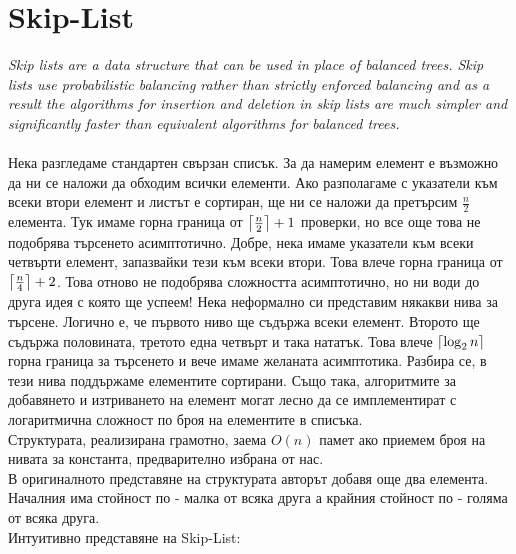 \documentclass[a4paper,12pt,fleqn]{article}
\DeclarePairedDelimiter\ceil{\lceil}{\rceil}
\begin{document}
	\section{Skip-List}
	\textit{Skip lists are a data structure that can be used in place of balanced trees.
		Skip lists use probabilistic balancing rather than strictly enforced balancing
		and as a result the algorithms for insertion and deletion in skip lists are
		much simpler and significantly faster than equivalent algorithms for
		balanced trees.}\\
	\\Нека разгледаме стандартен свързан списък. За да намерим елемент е възможно да ни се наложи да обходим всички елементи. Ако разполагаме с указатели към всеки втори елемент и листът е сортиран, ще ни се наложи да претърсим $\frac{n}{2}$ елемента. Тук имаме горна граница от $\ceil*{\frac{n}{2}} + 1$ проверки, но все още това не подобрява търсенето асимптотично. Добре, нека имаме указатели към всеки четвърти елемент, запазвайки тези към всеки втори. Това влече горна граница от $\ceil*{\frac{n}{4}} + 2$. Това отново не подобрява сложността асимптотично, но ни води до друга идея с която ще успеем! Нека неформално си представим някакви нива за търсене. Логично е, че първото ниво ще съдържа всеки елемент. Второто ще съдържа половината, третото една четвърт и така нататък. Това влече $\ceil*{\log_2{n}}$ горна граница за търсенето и вече имаме желаната асимптотика. Разбира се, в тези нива поддържаме елементите сортирани. Също така, алгоритмите за добавянето и изтриването на елемент могат лесно да се имплементират с логаритмична сложност по броя на елементите в списъка.\\
	Структурата, реализирана грамотно, заема $O(n)$ памет ако приемем броя на нивата за константа, предварително избрана от нас.\\
	В оригиналното представяне на структурата авторът добавя още два елемента. Началния има стойност по - малка от всяка друга а крайния стойност по - голяма от всяка друга.\\
	Интуитивно представяне на Skip-List:
	
\end{document}
